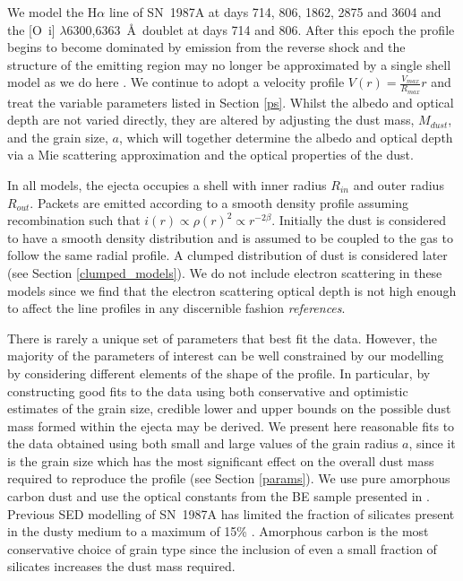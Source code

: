 We model the H$\alpha$ line of SN~1987A at days 714, 806, 1862, 2875 and 3604 and the 
[O~{\sc i}] $\lambda$6300,6363~\AA\ doublet at days 714 and 806. After this 
epoch the profile begins to become dominated by emission from the reverse shock 
and the structure of the emitting region may no longer be approximated by 
a single shell model as we do here \citep{Fransson2013}.  We continue to adopt a velocity profile $V(r) = 
\frac{V_{max}}{R_{max}}r$ and treat the variable parameters listed in 
Section \ref{ps}.  Whilst the albedo and optical depth are not varied 
directly, they are altered by adjusting the dust mass, $M_{dust}$, and the 
grain size, $a$, which will together determine the albedo and optical 
depth via a Mie scattering approximation and the optical properties of the 
dust.

In all models, the ejecta occupies a shell with inner radius $R_{in}$ and 
outer radius $R_{out}$.  Packets are emitted according to a smooth density 
profile assuming recombination such that $i(r) \propto \rho(r)^2 \propto 
r^{-2\beta}$.  Initially the dust is considered to have a smooth density 
distribution and is assumed to be coupled to the gas to follow the same 
radial profile.  A clumped distribution of dust is considered later (see 
Section \ref{clumped_models}).  We do not include electron scattering in 
these models since we find that the electron scattering optical depth is not high enough to affect the line 
profiles in any discernible fashion \textit{references}.




There is rarely a unique set of parameters that best fit the data.  However, the 
majority of the parameters of interest can be well constrained by our 
modelling by considering different elements of the shape of the profile.  In particular, by constructing good fits to 
the data using both conservative and optimistic estimates of the grain 
size, credible lower and upper bounds on the possible dust mass formed 
within the ejecta may be derived.  We present here
reasonable fits to the data obtained using both small and large values of the grain radius $a$, since 
it is the grain size which has the most significant effect on the overall 
dust mass required to reproduce the profile (see Section \ref{params}).  
We use pure amorphous carbon dust and use the optical 
constants from the BE sample presented in \citet{Zubko1996}.  Previous SED
modelling of SN~1987A has limited the fraction of silicates present in the dusty 
medium to a maximum of 15\% \citep{Ercolano2007,Wesson2015}. Amorphous 
carbon is the most conservative choice of grain type since the inclusion of even a small 
fraction of silicates increases the dust mass required.

